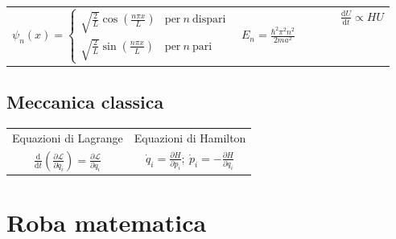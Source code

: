 \documentclass{article}
\begin{document}
\begin{tabular}{*{6}{c}}
    \multicolumn{2}{c|}{\multirow{4}{*}{$\psi_n(x) = \begin{cases}
        \sqrt{\frac{2}{L}}\cos\left(\frac{n\pi x}{L}\right) & \mathrm{per\ } n\ \mathrm{dispari} \\
        \sqrt{\frac{2}{L}}\sin\left(\frac{n\pi x}{L}\right) & \mathrm{per\ } n\ \mathrm{pari}
    \end{cases}\quad E_n = \frac{\hbar^2\pi^2n^2}{2ma^2} $}} & & & \multicolumn{1}{c|}{} & $\frac{\mathrm{d}U}{\mathrm{d}t} \propto HU $ \\
    \cline{6-6}
    \multicolumn{2}{c|}{}\\
    \multicolumn{2}{c|}{}\\
    \multicolumn{2}{c|}{}\\
    \cline{1-2}
\end{tabular}

\subsection*{Meccanica classica}

\begin{tabular}{*{2}{c}}
    Equazioni di Lagrange & Equazioni di Hamilton \\
    $\frac{\mathrm{d}}{\mathrm{d}t}\left(\frac{\partial \mathcal{L}}{\partial \dot{q}_i}\right) = \frac{\partial \mathcal{L}}{\partial q_i} $ & $\dot{q}_i = \frac{\partial H}{\partial p_i};\ \dot{p}_i = -\frac{\partial H}{\partial q_i} $ \\
\end{tabular}

\section*{Roba matematica}
\end{document}
